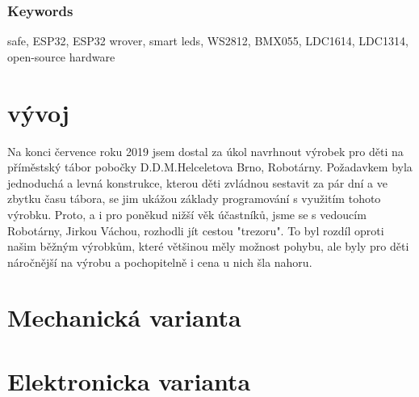\documentclass{template/socthesis}
\begin{document}
\subsection*{Keywords}
\color{black}
safe, ESP32, ESP32 wrover, smart leds, WS2812, BMX055, LDC1614, LDC1314, open-source hardware

\newpage
\pagestyle{plain}

\tableofcontents %

\setcounter{figure}{0}
\setcounter{table}{0}
\newpage






\chapter*{vývoj}

Na konci července roku 2019 jsem dostal za úkol navrhnout výrobek pro děti na příměstský tábor
pobočky D.D.M.Helceletova Brno, Robotárny. Požadavkem byla jednoduchá a levná konstrukce,
kterou děti zvládnou sestavit za pár dní a ve zbytku času tábora, se jim ukážou základy programování
s využitím tohoto výrobku. Proto, a i pro poněkud nižší věk účastníků, jsme se s vedoucím 
Robotárny, Jirkou Váchou, rozhodli jít cestou "trezoru". To byl rozdíl oproti našim běžným 
výrobkům, které většinou měly možnost pohybu, ale byly pro děti náročnější na výrobu
a pochopitelně i cena u nich šla nahoru.










\chapter*{Mechanická varianta}



\newpage
\chapter*{Elektronicka varianta}
\end{document}
